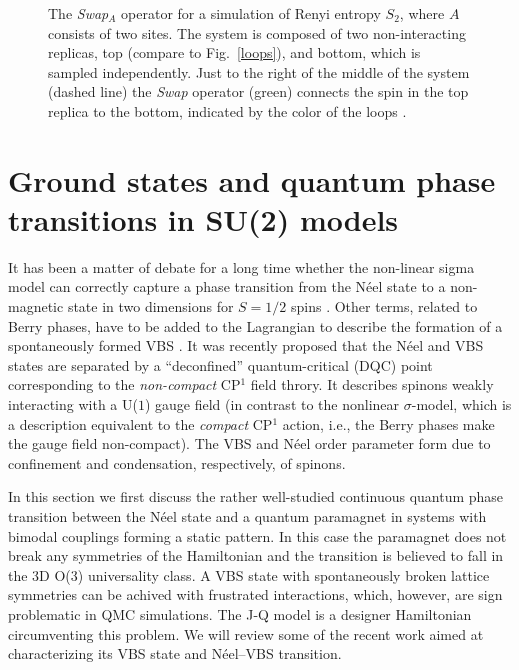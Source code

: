 \documentclass[range]{ar2e}
\begin{document}
\begin{figure}
\centerline{}
\caption{The {\it Swap}$_A$ operator for a simulation of Renyi entropy $S_2$, where $A$ consists of two sites.  The system is composed of two non-interacting 
replicas, top (compare to Fig.~\ref{loops}), and bottom, which is sampled independently.  Just to the right of the middle of the system (dashed line) 
the {\it Swap} operator (green) connects the spin in the top replica to the bottom, indicated by the color of the loops \cite{Kallin11}.  
}
\label{swap}
\end{figure}

\section{Ground states and quantum phase transitions in SU(2) models}
\label{sec:su2models}

It has been a matter of debate for a long time whether the non-linear sigma model can correctly capture a phase transition from the N\'eel state 
to a non-magnetic state in two dimensions for $S=1/2$ spins \cite{Chakravarty89}. Other terms, related to Berry phases, have to be added to the Lagrangian 
to describe the formation of a spontaneously formed VBS \cite{Read90,murthy1990:mono}. It was recently proposed that the N\'eel and VBS states are separated 
by a ``deconfined'' quantum-critical (DQC) point \cite{Senthil04a} corresponding to the {\it non-compact} CP$^1$ field throry. It describes spinons weakly interacting 
with a U($1$) gauge field (in contrast to the nonlinear $\sigma$-model, which is a description equivalent to the {\it compact} CP$^1$ action, i.e., the 
Berry phases make the gauge field non-compact). The VBS and N\'eel order parameter form due to confinement and condensation, respectively, of spinons. 

In this section we first discuss the rather well-studied continuous quantum phase transition between the N\'eel state and a quantum paramagnet in systems 
with bimodal couplings forming a static pattern. In this case the paramagnet does not break any symmetries of the Hamiltonian and the transition 
is believed to fall in the 3D O($3$) universality class. A VBS state with spontaneously broken lattice symmetries can be achived with frustrated 
interactions, which, however, are sign problematic in QMC simulations. The J-Q model \cite{Sandvik07} is a designer Hamiltonian circumventing this 
problem. We will review some of the recent work aimed at characterizing its VBS state and  N\'eel--VBS transition.
\end{document}
